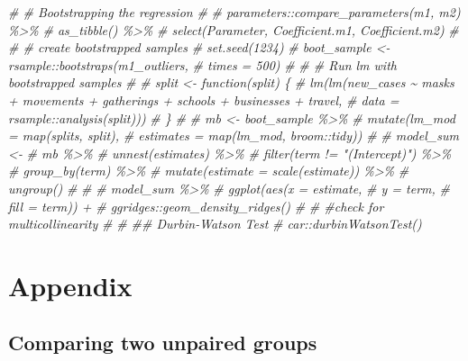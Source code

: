 \documentclass[
]{book}
\newenvironment{Shaded}{\begin{snugshade}}{\end{snugshade}}
\newcommand{\CommentTok}[1]{\textcolor[rgb]{0.56,0.35,0.01}{\textit{#1}}}
\begin{document}
\begin{Shaded}
\begin{Highlighting}[]
\CommentTok{\# \# Bootstrapping the regression}
\CommentTok{\#}
\CommentTok{\# parameters::compare\_parameters(m1, m2) \%\textgreater{}\%}
\CommentTok{\#   as\_tibble() \%\textgreater{}\%}
\CommentTok{\#   select(Parameter, Coefficient.m1, Coefficient.m2)}
\CommentTok{\#}
\CommentTok{\# \# create bootstrapped samples}
\CommentTok{\# set.seed(1234)}
\CommentTok{\# boot\_sample \textless{}{-} rsample::bootstraps(m1\_outliers,}
\CommentTok{\#                                            times = 500)}
\CommentTok{\#}
\CommentTok{\# \# Run lm with bootstrapped samples}
\CommentTok{\#}
\CommentTok{\# split \textless{}{-} function(split) \{}
\CommentTok{\#   lm(lm(new\_cases \textasciitilde{} masks + movements + gatherings + schools + businesses + travel,}
\CommentTok{\#         data = rsample::analysis(split)))}
\CommentTok{\# \}}
\CommentTok{\#}
\CommentTok{\# mb \textless{}{-} boot\_sample \%\textgreater{}\%}
\CommentTok{\#   mutate(lm\_mod = map(splits, split),}
\CommentTok{\#          estimates = map(lm\_mod, broom::tidy))}
\CommentTok{\#}
\CommentTok{\# model\_sum \textless{}{-}}
\CommentTok{\#   mb \%\textgreater{}\%}
\CommentTok{\#   unnest(estimates) \%\textgreater{}\%}
\CommentTok{\#   filter(term != "(Intercept)") \%\textgreater{}\%}
\CommentTok{\#   group\_by(term) \%\textgreater{}\%}
\CommentTok{\#   mutate(estimate = scale(estimate)) \%\textgreater{}\%}
\CommentTok{\#   ungroup()}
\CommentTok{\#}
\CommentTok{\#}
\CommentTok{\# model\_sum \%\textgreater{}\%}
\CommentTok{\#   ggplot(aes(x = estimate,}
\CommentTok{\#              y = term,}
\CommentTok{\#              fill = term)) +}
\CommentTok{\#   ggridges::geom\_density\_ridges()}
\CommentTok{\#}
\CommentTok{\# \#check for multicollinearity}
\CommentTok{\#}
\CommentTok{\# \#\# Durbin{-}Watson Test}
\CommentTok{\# car::durbinWatsonTest()}
\end{Highlighting}
\end{Shaded}

\hypertarget{appendix}{%
\chapter*{Appendix}\label{appendix}}

\hypertarget{comparing-two-unpaired-groups}{%
\section{Comparing two unpaired groups}\label{comparing-two-unpaired-groups}}
\end{document}
